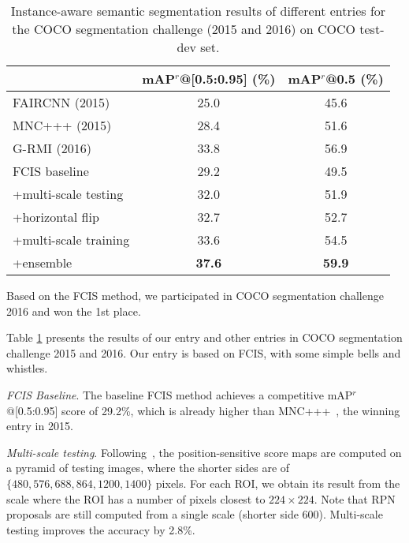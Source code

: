 \documentclass[10pt,twocolumn,letterpaper]{article}
\begin{document}
\setlength{\tabcolsep}{5pt}
\renewcommand{\arraystretch}{1.2}
\begin{table}
\begin{center}
\small
\begin{tabular}{l|c|c}
\hline
 & \scriptsize mAP$^r$@[0.5:0.95] (\%) & \scriptsize mAP$^r$@0.5 (\%) \\
\hline
\hline
\footnotesize FAIRCNN (2015)                  & 25.0 & 45.6 \\
\footnotesize MNC+++ (2015)                   & 28.4 & 51.6 \\
\footnotesize G-RMI (2016)                    & 33.8 & 56.9 \\
\hline
\footnotesize FCIS baseline                   & 29.2 & 49.5 \\
\footnotesize +multi-scale testing            & 32.0 & 51.9 \\
\footnotesize +horizontal flip                & 32.7 & 52.7 \\
\footnotesize +multi-scale training           & 33.6 & 54.5 \\
\footnotesize +ensemble                       & \textbf{37.6} & \textbf{59.9} \\
\hline
\end{tabular}
\end{center}
\caption{Instance-aware semantic segmentation results of different entries for the COCO segmentation challenge (2015 and 2016) on COCO test-dev set.}
\label{tab:challenge_coco}
\end{table}

Based on the FCIS method, we participated in COCO segmentation challenge 2016 and won the 1st place.

Table \ref{tab:challenge_coco} presents the results of our entry and other entries in COCO segmentation challenge 2015 and 2016. Our entry is based on FCIS, with some simple bells and whistles.

\emph{FCIS Baseline}. The baseline FCIS method achieves a competitive mAP$^r$@[0.5:0.95] score of 29.2\%, which is already higher than MNC+++~\cite{dai2016mnc}, the winning entry in 2015. 

\emph{Multi-scale testing}. Following~\cite{he2014spatial,he2016deep}, the position-sensitive score maps are computed on a pyramid of testing images, where the shorter sides are of $\{480, 576, 688, 864, 1200, 1400\}$ pixels. For each ROI, we obtain its result from the scale where the ROI has a number of pixels closest to $224\times224$. Note that RPN proposals are still computed from a single scale (shorter side 600). Multi-scale testing improves the accuracy by 2.8\%. 
\end{document}
